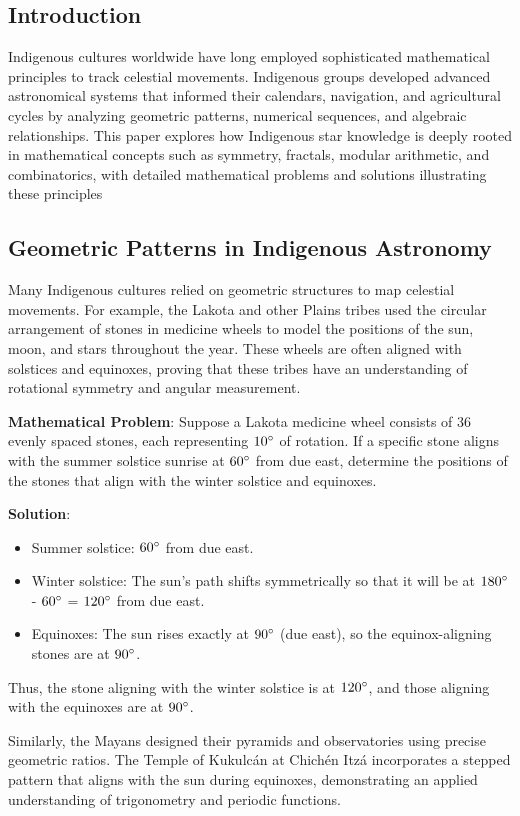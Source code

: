 \documentclass{article}
\begin{document}
\begin{multicols}{2}
\subsection*{Introduction}
Indigenous cultures worldwide have long employed sophisticated mathematical principles to track celestial movements. Indigenous groups developed advanced astronomical systems that informed their calendars, navigation, and agricultural cycles by analyzing geometric patterns, numerical sequences, and algebraic relationships. This paper explores how Indigenous star knowledge is deeply rooted in mathematical concepts such as symmetry, fractals, modular arithmetic, and combinatorics, with detailed mathematical problems and solutions illustrating these principles
\subsection*{Geometric Patterns in Indigenous Astronomy}
Many Indigenous cultures relied on geometric structures to map celestial movements. For example, the Lakota and other Plains tribes used the circular arrangement of stones in medicine wheels to model the positions of the sun, moon, and stars throughout the year. These wheels are often aligned with solstices and equinoxes, proving that these tribes have an understanding of rotational symmetry and angular measurement.

\textbf{Mathematical Problem}:  Suppose a Lakota medicine wheel consists of $36$ evenly spaced stones, each representing $10 \degree$ of rotation. If a specific stone aligns with the summer solstice sunrise at $60 \degree$ from due east, determine the positions of the stones that align with the winter solstice and equinoxes.

\textbf{Solution}:   
\begin{itemize}
    \item Summer solstice: $60 \degree$ from due east.
    \item Winter solstice: The sun’s path shifts symmetrically so that it will be at $180 \degree$ - $60 \degree$ = $120 \degree$ from due east.
    \item Equinoxes: The sun rises exactly at $90 \degree$ (due east), so the equinox-aligning stones are at $90 \degree$.
\end{itemize}
Thus, the stone aligning with the winter solstice is at $120 \degree$, and those aligning with the equinoxes are at $90 \degree$.

Similarly, the Mayans designed their pyramids and observatories using precise geometric ratios. The Temple of Kukulcán at Chichén Itzá incorporates a stepped pattern that aligns with the sun during equinoxes, demonstrating an applied understanding of trigonometry and periodic functions.


\end{multicols}
\end{document}
